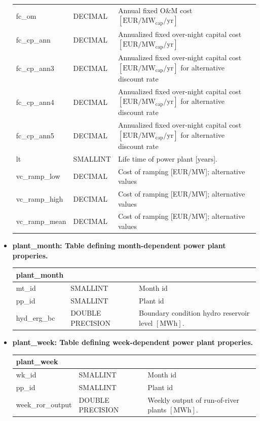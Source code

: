 \documentclass[]{article}
\begin{document}
\begin{itemize}
\begin{tabular}{@{}llp{8cm}@{}}
fc\_om & DECIMAL & Annual fixed O\&M cost $[\mathrm{EUR/MW_{cap}/yr}]$ \\
fc\_cp\_ann & DECIMAL & Annualized fixed over-night capital cost $[\mathrm{EUR/MW_{cap}/yr}]$ \\
fc\_cp\_ann3 & DECIMAL & Annualized fixed over-night capital cost $[\mathrm{EUR/MW_{cap}/yr}]$ for alternative discount rate \\
fc\_cp\_ann4 & DECIMAL & Annualized fixed over-night capital cost $[\mathrm{EUR/MW_{cap}/yr}]$ for alternative discount rate \\
fc\_cp\_ann5 & DECIMAL & Annualized fixed over-night capital cost $[\mathrm{EUR/MW_{cap}/yr}]$ for alternative discount rate \\
lt & SMALLINT & Life time of power plant {[}$\mathrm{years}${]}. \\
vc\_ramp\_low & DECIMAL & Cost of ramping {[}EUR/MW{]}; alternative values \\
vc\_ramp\_high & DECIMAL & Cost of ramping {[}EUR/MW{]}; alternative values \\
vc\_ramp\_mean & DECIMAL & Cost of ramping {[}EUR/MW{]}; alternative values \\
\bottomrule
\end{tabular}

\item \textbf{plant\_month: Table defining month-dependent power plant
properies.}

\begin{tabular}{@{}lll@{}}
\toprule
plant\_month & & \\
\midrule
mt\_id & SMALLINT & Month id \\
pp\_id & SMALLINT & Plant id \\
hyd\_erg\_bc & DOUBLE PRECISION & Boundary condition hydro reservoir level $[\mathrm{MWh}]$. \\
\bottomrule
\end{tabular}

\item \textbf{plant\_week: Table defining week-dependent power plant
properies.}

\begin{tabular}{@{}lll@{}}
\toprule
plant\_week & & \\
\midrule
wk\_id & SMALLINT & Month id \\
pp\_id & SMALLINT & Plant id \\
week\_ror\_output & DOUBLE PRECISION & Weekly output of run-of-river plants $[\mathrm{MWh}]$.\\
\bottomrule
\end{tabular}


\end{itemize}
\end{document}
